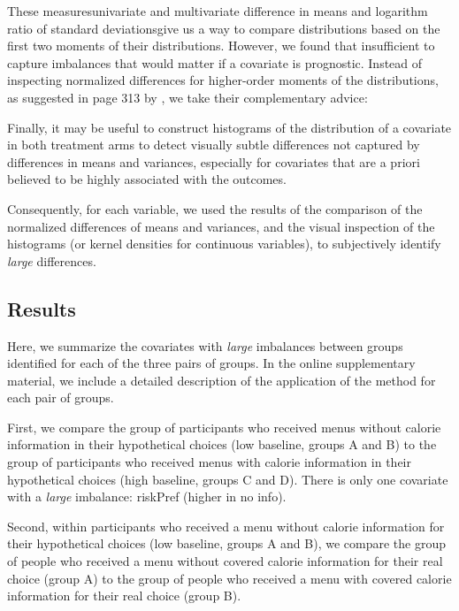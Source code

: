 These measures\textemdash univariate and multivariate difference in means and logarithm ratio of standard deviations\textemdash give us a way to compare distributions based on the first two moments of their distributions. However, we found that insufficient to capture imbalances that would matter if a covariate is prognostic. Instead of inspecting normalized differences for higher-order moments of the distributions, as suggested in page 313 by \citet{imbensCausalInferenceStatistics2015}, we take their complementary advice:

\begin{displayquote}
  Finally, it may be useful to construct histograms of the distribution of a covariate in both treatment arms to detect visually subtle differences not captured by differences in means and variances, especially for covariates that are a priori believed to be highly associated with the outcomes.
\end{displayquote}

Consequently, for each variable, we used the results of the comparison of the normalized differences of means and variances, and the visual inspection of the histograms (or kernel densities for continuous variables), to subjectively identify \emph{large} differences.

\subsection{Results}

Here, we summarize the covariates with \emph{large} imbalances between groups identified for each of the three pairs of groups. In the online supplementary material, we include a detailed description of the application of the method for each pair of groups.

First, we compare the group of participants who received menus without calorie information in their hypothetical choices (low baseline, groups A and B) to the group of participants who received menus with calorie information in their hypothetical choices (high baseline, groups C and D). There is only one covariate with a \emph{large} imbalance: riskPref (higher in no info).


Second, within participants who received a menu without calorie information for their hypothetical choices (low baseline, groups A and B), we compare the group of people who received a menu without covered calorie information for their real choice (group A) to the group of people who received a menu with covered calorie information for their real choice (group B).

